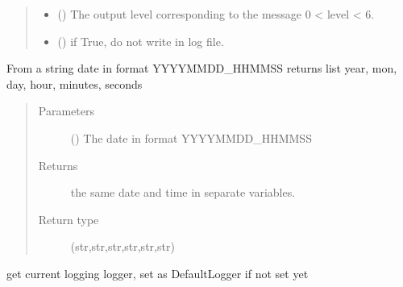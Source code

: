 \documentclass[a4paper,10pt,english]{sphinxmanual}
\begin{document}
\begin{fulllineitems}
\begin{fulllineitems}
\begin{quote}
\begin{description}
\begin{itemize}
\item {} 
 () \textendash{} The output level corresponding 
to the message 0 \textless{} level \textless{} 6.

\item {} 
 () \textendash{} if True, do not write in log file.

\end{itemize}

\end{description}\end{quote}

\end{fulllineitems}


\end{fulllineitems}


\begin{fulllineitems}
\label{\detokenize{commands/apidoc/src:src.logger.date_to_datetime}}
From a string date in format YYYYMMDD\_HHMMSS
returns list year, mon, day, hour, minutes, seconds
\begin{quote}\begin{description}
\item[{Parameters}] \leavevmode
{} () \textendash{} The date in format YYYYMMDD\_HHMMSS

\item[{Returns}] \leavevmode
the same date and time in separate variables.

\item[{Return type}] \leavevmode
(str,str,str,str,str,str)

\end{description}\end{quote}

\end{fulllineitems}


\begin{fulllineitems}
\label{\detokenize{commands/apidoc/src:src.logger.getCurrentLogger}}
get current logging logger, set as DefaultLogger if not set yet

\end{fulllineitems}
\end{document}
